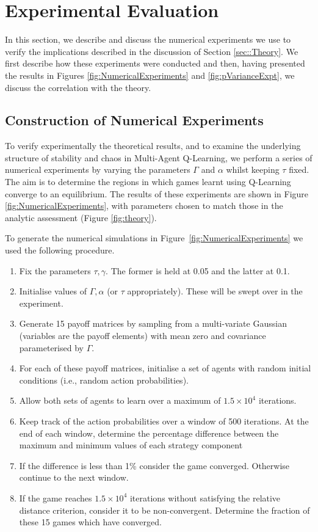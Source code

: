 \documentclass[sigconf,anonymous]{aamas}
\begin{document}

\section{Experimental Evaluation} \label{sec:exev}

In this section, we describe and discuss the numerical experiments we use to verify the implications described in the discussion of Section \ref{sec::Theory}. We first describe how these experiments were conducted and then, having presented the results in Figures \ref{fig:NumericalExperiments} and \ref{fig:pVarianceExpt}, we discuss the correlation with the theory.

\subsection{Construction of Numerical Experiments}

To verify experimentally the theoretical results, and to examine the underlying structure of stability and chaos in
Multi-Agent Q-Learning, we perform a series of numerical experiments by varying the parameters $\Gamma$ and
$\alpha$ whilst keeping $\tau$ fixed. The aim is to determine the regions in which games learnt using Q-Learning converge to an equilibrium. The results of these experiments are shown in Figure \ref{fig:NumericalExperiments}, with parameters chosen to match those in the analytic assessment (Figure \ref{fig:theory}).

To generate the numerical simulations in Figure~\ref{fig:NumericalExperiments} we used the
following procedure.
\begin{enumerate}
   \item Fix the parameters $\tau, \gamma$. The former is held at 0.05 and the latter at 0.1.
   \item Initialise values of $\Gamma, \alpha$ (or $\tau$ appropriately). These will be swept over in the experiment.
\item Generate 15 payoff matrices by sampling from a multi-variate Gaussian 
(variables are the payoff elements) with mean zero and covariance parameterised by $\Gamma$.
\item For each of these payoff matrices, initialise a set of agents with random initial conditions (i.e., random action probabilities).
\item Allow both sets of agents to learn over a maximum of $1.5 \times 10^4$ iterations.
\item Keep track of the action probabilities over a window of 500 iterations. At the end of each window, determine the percentage difference between the maximum and minimum values of each strategy component
\item If the difference is less than 1\% consider the game converged. Otherwise continue to the next window.
\item If the game reaches $1.5 \times 10^4$ iterations without satisfying the relative distance criterion, consider it to be non-convergent. Determine the fraction of these 15 games which have converged.

\end{enumerate}
   
\end{document}

